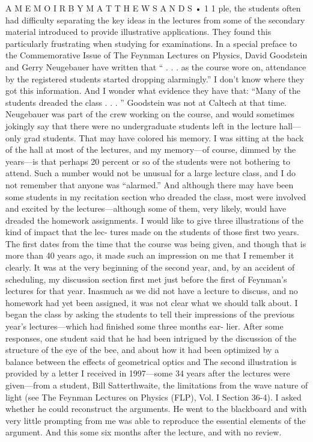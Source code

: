 \documentclass[10pt,oneside]{article}
\begin{document}
A  M E M O I R  B Y  M A T T H E W  S A N D S • 1 1 ple, the students often had difficulty separating the key ideas in the lectures from some of the secondary material introduced to provide illustrative applications. They found this particularly frustrating when studying for examinations. In a special preface to the Commemorative Issue of The Feynman Lectures on Physics, David Goodstein and Gerry Neugebauer have written that “ . . . as the course wore on, attendance by the registered students started dropping alarmingly.” I don’t know where they got this information. And I wonder what evidence they have that: “Many of the students dreaded the class . . . ” Goodstein was not at Caltech at that time. Neugebauer was part of the crew working on the course, and would sometimes jokingly say that there were no undergraduate students left in the lecture hall---only grad students. That may have colored his memory. I was sitting at the back of the hall at most of the lectures, and my memory---of course, dimmed by the years---is that perhaps 20 percent or so of the students were not bothering to attend. Such a number would not be unusual for a large lecture class, and I do not remember that anyone was “alarmed.” And although there may have been some students in my recitation section who dreaded the class, most were involved and excited by the lectures---although some of them, very likely, would have dreaded the homework assignments. I would like to give three illustrations of the kind of impact that the lec- tures made on the students of those first two years. The first dates from the time that the course was being given, and though that is more than 40 years ago, it made such an impression on me that I remember it clearly. It was at the very beginning of the second year, and, by an accident of scheduling, my discussion section first met just before the first of Feynman’s lectures for that year. Inasmuch as we did not have a lecture to discuss, and no homework had yet been assigned, it was not clear what we should talk about. I began the class by asking the students to tell their impressions of the previous year’s lectures---which had finished some three months ear- lier. After some responses, one student said that he had been intrigued by the discussion of the structure of the eye of the bee, and about how it had been optimized by a balance between the effects of geometrical optics and The second illustration is provided by a letter I received in 1997---some 34 years after the lectures were given---from a student, Bill Satterthwaite, the limitations from the wave nature of light (see The Feynman Lectures on Physics (FLP), Vol. I Section 36-4). I asked whether he could reconstruct the arguments. He went to the blackboard and with very little prompting from me was able to reproduce the essential elements of the argument. And this some six months after the lecture, and with no review.\par
\end{document}
